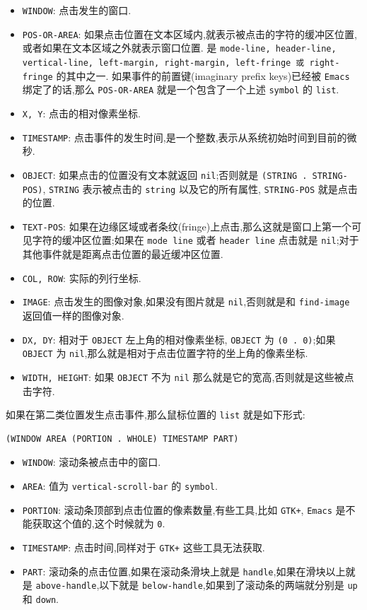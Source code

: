 \documentclass[11pt]{article}
\begin{document}
\begin{enumerate}
\begin{itemize}
\item \texttt{WINDOW}: 点击发生的窗口.
\item \texttt{POS-OR-AREA}: 如果点击位置在文本区域内,就表示被点击的字符的缓冲区位置,或者如果在文本区域之外就表示窗口位置.
是 \texttt{mode-line, header-line, vertical-line, left-margin, right-margin, left-fringe 或 right-fringe} 的其中之一.
如果事件的前置键(imaginary prefix keys)已经被 \texttt{Emacs} 绑定了的话,那么 \texttt{POS-OR-AREA} 就是一个包含了一个上述 \texttt{symbol} 的 \texttt{list}.
\item \texttt{X, Y}: 点击的相对像素坐标.
\item \texttt{TIMESTAMP}: 点击事件的发生时间,是一个整数,表示从系统初始时间到目前的微秒.
\item \texttt{OBJECT}: 如果点击的位置没有文本就返回 \texttt{nil};否则就是 \texttt{(STRING . STRING-POS)}, \texttt{STRING} 表示被点击的 \texttt{string} 以及它的所有属性, \texttt{STRING-POS} 就是点击的位置.
\item \texttt{TEXT-POS}: 如果在边缘区域或者条纹(fringe)上点击,那么这就是窗口上第一个可见字符的缓冲区位置;如果在 \texttt{mode line} 或者 \texttt{header line} 点击就是 \texttt{nil};对于其他事件就是距离点击位置的最近缓冲区位置.
\item \texttt{COL, ROW}: 实际的列行坐标.
\item \texttt{IMAGE}: 点击发生的图像对象,如果没有图片就是 \texttt{nil},否则就是和 \texttt{find-image} 返回值一样的图像对象.
\item \texttt{DX, DY}: 相对于 \texttt{OBJECT} 左上角的相对像素坐标, \texttt{OBJECT} 为 \texttt{(0 . 0)};如果 \texttt{OBJECT} 为 \texttt{nil},那么就是相对于点击位置字符的坐上角的像素坐标.
\item \texttt{WIDTH, HEIGHT}: 如果 \texttt{OBJECT} 不为 \texttt{nil} 那么就是它的宽高,否则就是这些被点击字符.
\end{itemize}


如果在第二类位置发生点击事件,那么鼠标位置的 \texttt{list} 就是如下形式:

\begin{verbatim}
(WINDOW AREA (PORTION . WHOLE) TIMESTAMP PART)
\end{verbatim}

\begin{itemize}
\item \texttt{WINDOW}: 滚动条被点击中的窗口.
\item \texttt{AREA}: 值为 \texttt{vertical-scroll-bar} 的 \texttt{symbol}.
\item \texttt{PORTION}: 滚动条顶部到点击位置的像素数量,有些工具,比如 \texttt{GTK+}, \texttt{Emacs} 是不能获取这个值的,这个时候就为 \texttt{0}.
\item \texttt{TIMESTAMP}: 点击时间,同样对于 \texttt{GTK+} 这些工具无法获取.
\item \texttt{PART}: 滚动条的点击位置,如果在滚动条滑块上就是 \texttt{handle},如果在滑块以上就是 \texttt{above-handle},以下就是 \texttt{below-handle},如果到了滚动条的两端就分别是 \texttt{up} 和 \texttt{down}.
\end{itemize}



\end{enumerate}
\end{document}

